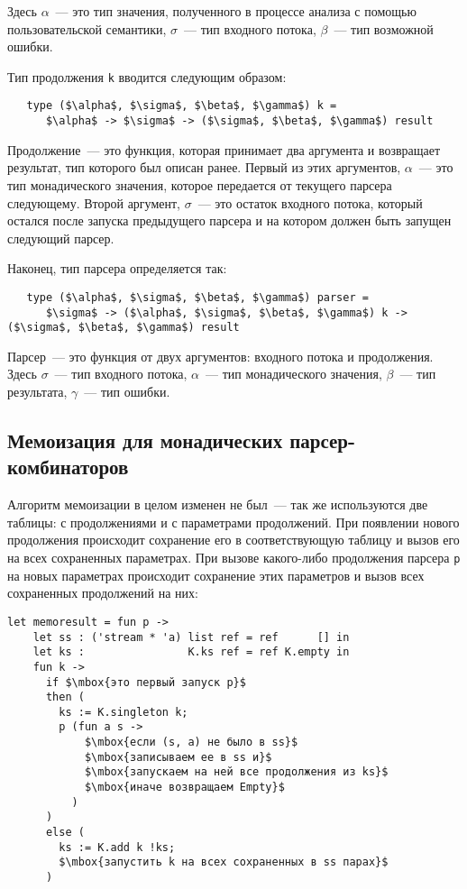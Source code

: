 \documentclass[conference]{IEEEtran}
\begin{document}
Здесь $\alpha$~--- это тип значения, полученного в процессе анализа с помощью пользовательской семантики, $\sigma$~--- тип входного потока, $\beta$~--- тип возможной ошибки.

Тип продолжения \lstinline|k| вводится следующим образом:

\begin{lstlisting}
   type ($\alpha$, $\sigma$, $\beta$, $\gamma$) k =
      $\alpha$ -> $\sigma$ -> ($\sigma$, $\beta$, $\gamma$) result
\end{lstlisting}

Продолжение~--- это функция, которая принимает два аргумента и возвращает результат, тип которого был описан ранее. Первый из этих аргументов, $\alpha$~--- это тип монадического значения,
которое передается от текущего парсера следующему. Второй аргумент, $\sigma$~--- это остаток входного потока, который остался после запуска предыдущего парсера и на котором должен быть
запущен следующий парсер.

Наконец, тип парсера определяется так:

\begin{lstlisting}
   type ($\alpha$, $\sigma$, $\beta$, $\gamma$) parser =
      $\sigma$ -> ($\alpha$, $\sigma$, $\beta$, $\gamma$) k -> ($\sigma$, $\beta$, $\gamma$) result
\end{lstlisting}

Парсер~--- это функция от двух аргументов: входного потока и продолжения. Здесь $\sigma$~--- тип входного потока, $\alpha$~--- тип монадического значения, $\beta$~--- тип результата, $\gamma$~---
тип ошибки.

\subsection{Мемоизация для монадических парсер-комбинаторов}

Алгоритм мемоизации в целом изменен не был~--- так же используются две таблицы: с продолжениями и с параметрами продолжений. При появлении нового продолжения происходит сохранение
его в соответствующую таблицу и вызов его на всех сохраненных параметрах. При вызове какого-либо продолжения парсера  \lstinline|p| на новых параметрах происходит сохранение этих
параметров и вызов всех сохраненных продолжений на них:

\begin{lstlisting}[basicstyle=\small]
  let memoresult = fun p ->
    let ss : ('stream * 'a) list ref = ref      [] in
    let ks :                K.ks ref = ref K.empty in
    fun k ->
      if $\mbox{это первый запуск p}$
      then (
        ks := K.singleton k;
        p (fun a s ->
            $\mbox{если (s, a) не было в ss}$
            $\mbox{записываем ее в ss и}$
            $\mbox{запускаем на ней все продолжения из ks}$
            $\mbox{иначе возвращаем Empty}$
          )
      )
      else (
        ks := K.add k !ks;
        $\mbox{запустить k на всех сохраненных в ss парах}$
      )
\end{lstlisting}
\end{document}
